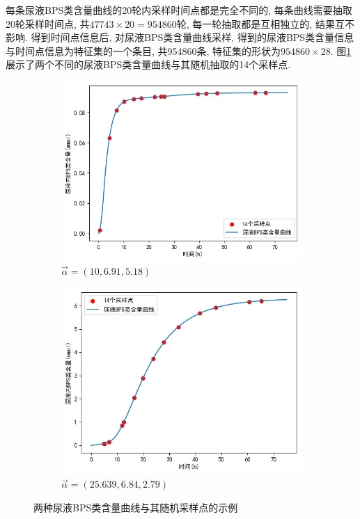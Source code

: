 \documentclass[a4paper,punct=banjiao,twoside]{ctexrep}
\theoremstyle{plain}
\theoremstyle{definition}
\theoremstyle{remark}
\begin{document}
每条尿液BPS类含量曲线的20轮内采样时间点都是完全不同的, 每条曲线需要抽取20轮采样时间点, 共$47743\times 20 = 954860$轮, 每一轮抽取都是互相独立的, 结果互不影响.
得到时间点信息后, 对尿液BPS类含量曲线采样, 得到的尿液BPS类含量信息与时间点信息为特征集的一个条目, 共954860条, 特征集的形状为$954860\times 28$. 
图\ref{14采样点}展示了两个不同的尿液BPS类含量曲线与其随机抽取的14个采样点.
\begin{figure}[H]
  \centering
  \begin{subfigure}{0.45\textwidth}
    \centering
    \includegraphics[scale=0.5]{./figs/p6_1.png}
    \caption{$\vec{\alpha}=(10 , 6.91,  5.18)$}

  \end{subfigure}
  \begin{subfigure}{0.45\textwidth}
    \centering
    \includegraphics[scale=0.5]{./figs/p6_2.png}
    \caption{$\vec{\alpha}=(25.639  ,6.84, 2.79)$}
    
  \end{subfigure}
  \caption{两种尿液BPS类含量曲线与其随机采样点的示例}
  \label{14采样点}
\end{figure}
\end{document}
